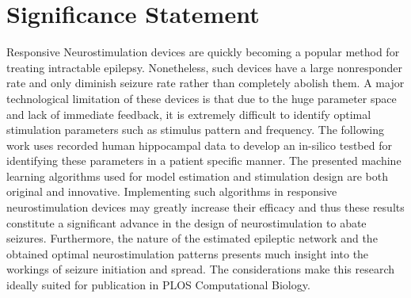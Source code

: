 \documentclass[11pt,a4paper,final]{article}
\begin{document}
\section*{Significance Statement}
Responsive Neurostimulation devices are quickly becoming a popular method for treating intractable epilepsy.
Nonetheless, such devices have a large nonresponder rate and only diminish seizure rate rather than completely abolish them.
A major technological limitation of these devices is that due to the huge parameter space and lack of immediate feedback, it is extremely difficult to identify optimal stimulation parameters such as stimulus pattern and frequency.
The following work uses recorded human hippocampal data to develop an in-silico testbed for identifying these parameters in a patient specific manner.
The presented machine learning algorithms used for model estimation and stimulation design are both original and innovative. 
Implementing such algorithms in responsive neurostimulation devices may greatly increase their efficacy and thus these results constitute a significant advance in the design of neurostimulation to abate seizures.
Furthermore, the nature of the estimated epileptic network and the obtained optimal neurostimulation patterns presents much insight into the workings of seizure initiation and spread. 
The considerations make this research ideally suited for publication in PLOS Computational Biology. 
\end{document}
